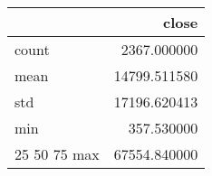 \begin{tabular}{lr}
\toprule
 & close \\
\midrule
count & 2367.000000 \\
mean & 14799.511580 \\
std & 17196.620413 \\
min & 357.530000 \\
25%
50%
75%
max & 67554.840000 \\
\bottomrule
\end{tabular}
